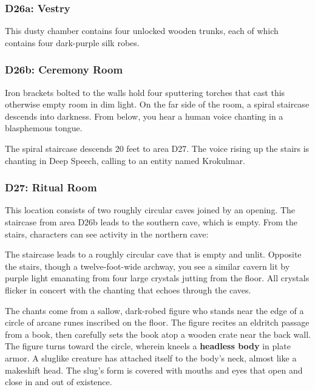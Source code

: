 \documentclass[10pt,a4paper,twoside,bg=print,twocolumn,openany,nodeprecatedcode]{dndbook}
\begin{document}
\subsubsection{D26a: Vestry}
This dusty chamber contains four unlocked wooden trunks, each of which contains four dark-purple silk robes.

\subsubsection{D26b: Ceremony Room}
\begin{DndReadAloud}{}
Iron brackets bolted to the walls hold four sputtering torches that cast this otherwise empty room in dim light. On the far side of the room, a spiral staircase descends into darkness. From below, you hear a human voice chanting in a blasphemous tongue.

\end{DndReadAloud}

The spiral staircase descends 20 feet to area D27. The voice rising up the stairs is chanting in Deep Speech, calling to an entity named Krokulmar.

\subsubsection{D27: Ritual Room}
This location consists of two roughly circular caves joined by an opening. The staircase from area D26b leads to the southern cave, which is empty. From the stairs, characters can see activity in the northern cave:

\begin{DndReadAloud}{}
The staircase leads to a roughly circular cave that is empty and unlit. Opposite the stairs, though a twelve-foot-wide archway, you see a similar cavern lit by purple light emanating from four large crystals jutting from the floor. All crystals flicker in concert with the chanting that echoes through the caves.

The chants come from a sallow, dark-robed figure who stands near the edge of a circle of arcane runes inscribed on the floor. The figure recites an eldritch passage from a book, then carefully sets the book atop a wooden crate near the back wall. The figure turns toward the circle, wherein kneels a \textbf{headless body} in plate armor. A sluglike creature has attached itself to the body's neck, almost like a makeshift head. The slug's form is covered with mouths and eyes that open and close in and out of existence.

\end{DndReadAloud}
\end{document}
